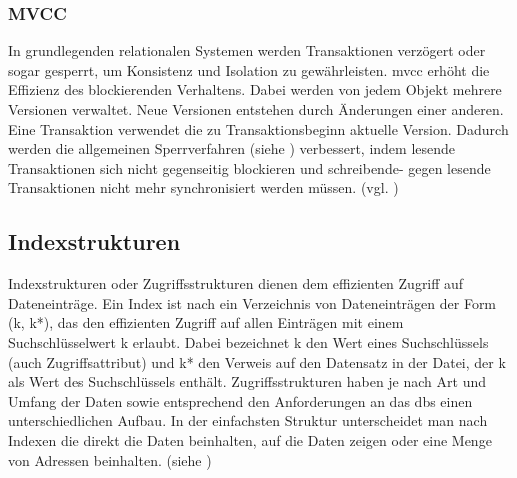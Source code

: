 \subsubsection{MVCC}
In grundlegenden relationalen Systemen werden Transaktionen verzögert oder sogar gesperrt, um Konsistenz und Isolation zu gewährleisten.
\Gls{mvcc} erhöht die Effizienz des  blockierenden Verhaltens.
Dabei werden von jedem Objekt mehrere Versionen verwaltet.
Neue Versionen entstehen durch Änderungen einer anderen.
Eine Transaktion verwendet die zu Transaktionsbeginn aktuelle Version.
Dadurch werden die allgemeinen Sperrverfahren (siehe \cite[S.266 ff.]{book:kudrass}) verbessert, indem lesende Transaktionen sich nicht gegenseitig blockieren und schreibende- gegen lesende Transaktionen nicht mehr synchronisiert werden müssen. (vgl. \cite[S.270]{book:kudrass})








\subsection{Indexstrukturen}
Indexstrukturen oder Zugriffsstrukturen dienen dem effizienten Zugriff auf Dateneinträge.
Ein Index ist nach \cite[S.284]{book:kudrass} ein Verzeichnis von Dateneinträgen der Form (k, k*), das den effizienten Zugriff auf allen Einträgen mit einem Suchschlüsselwert k erlaubt. Dabei bezeichnet k den Wert eines Suchschlüssels (auch Zugriffsattribut) und k* den Verweis auf den Datensatz in der Datei, der k als Wert des Suchschlüssels enthält.
Zugriffsstrukturen haben je nach Art und Umfang der Daten sowie entsprechend den Anforderungen an das \Gls{dbs} einen unterschiedlichen Aufbau.
In der einfachsten Struktur unterscheidet man nach Indexen die direkt die Daten beinhalten, auf die Daten zeigen oder eine Menge von Adressen beinhalten. (siehe \cite[S.284]{book:kudrass})

